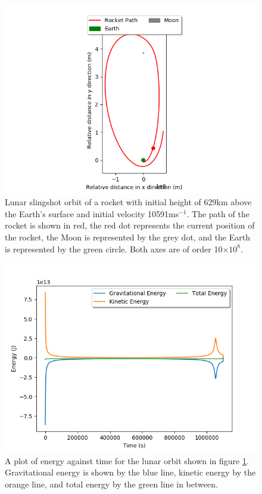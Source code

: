 \documentclass[twocolumn,prl,nobalancelastpage,aps,10pt]{revtex4-1}
\begin{document}
\begin{figure}[ht]
	\includegraphics*[width=0.96\linewidth,clip]{moonE}
	\caption{Lunar slingshot orbit of a rocket with initial height of 629km above the Earth's surface and initial velocity 10591ms$^{-1}$. The path of the rocket is shown in red, the red dot represents the current position of the rocket, the Moon is represented by the grey dot, and the Earth is represented by the green circle. Both axes are of order 10$\times10^{8}$.} \label{moonEFig}
\end{figure}

\begin{figure}[ht]
	\includegraphics*[width=0.96\linewidth,clip]{moonEEnergy}
	\caption{A plot of energy against time for the lunar orbit shown in figure \ref{moonEFig}. Gravitational energy is shown by the blue line, kinetic energy by the orange line, and total energy by the green line in between.} \label{moonEEn}
\end{figure}
\end{document}
